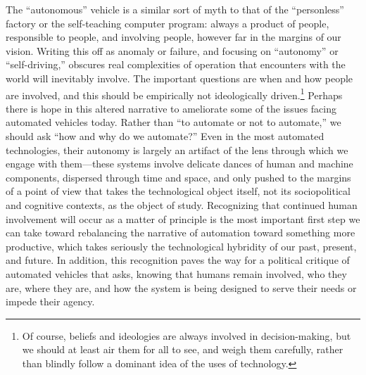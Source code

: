 The ``autonomous'' vehicle is a
similar sort of myth to that of the ``personless'' factory or the
self-teaching computer program: always a 
product of people, responsible to people, and involving people,
however far in the margins of our vision. Writing this off as
anomaly or failure, and focusing on ``autonomy'' or ``self-driving,''
obscures real complexities of operation that encounters with the world
will inevitably involve. The important questions are when and how 
people are
involved, and this should be empirically not ideologically
driven.\footnote{Of course, beliefs and ideologies are always involved
  in decision-making, but we should at least air them for all to see,
  and weigh them carefully, rather than blindly follow a dominant
  idea of the uses of technology.}
Perhaps there is hope in this altered narrative to ameliorate some of
the issues facing automated vehicles today. 
Rather than ``to automate or not to automate,'' we should ask
``how and why do we automate?'' Even in the most automated
technologies, their 
autonomy is largely an artifact of the lens through which we engage
with them---these systems involve delicate dances of human and machine
components, dispersed through time and space, and only pushed to the
margins of a point of view that takes the technological object itself,
not its sociopolitical and cognitive contexts, as the object of study.
Recognizing that continued human involvement will occur as a matter of
principle is 
the most important first step we can take toward rebalancing the
narrative of automation toward something more productive, which takes
seriously the technological hybridity of our past, present, and future.
In addition, this recognition paves the way for a political critique
of automated vehicles 
that asks, knowing 
that humans remain involved, who they are, where they are, and how
the system is being designed to serve their needs or impede their
agency.

